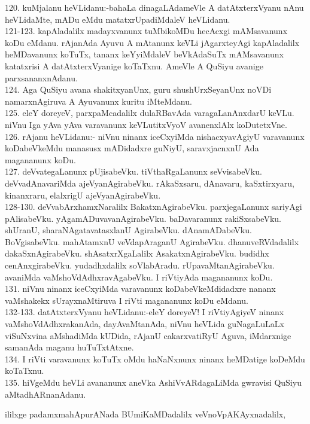 \documentclass{article}
\begin{document}
120. kuMjalanu heVLidanu:-bahaLa dinagaLAdameVle A datAtxterxVyanu nAnu heVLidaMte, mADu eMdu matatxrUpadiMdaleV heVLidanu.\\
121-123. kapAladalilx madayxvanunx tuMbikoMDu hecAcxgi mAMsavanunx koDu eMdanu. rAjanAda Ayuvu A mAtanunx keVLi jAgarxteyAgi kapAladalilx heMDavanunx koTuTx, tananx keYyiMdaleV beVkAdaSuTx mAMsavanunx katatxrisi A datAtxterxVyanige koTaTxnu. AmeVle A QuSiyu avanige parxsananxnAdanu.\\
124. Aga QuSiyu avana shakitxyanUnx, guru shushUrxSeyanUnx noVDi namarxnAgiruva A Ayuvanunx kuritu iMteMdanu.\\
125. eleY doreyeV, parxpaMcadalilx dulaRBavAda varagaLanAnxdarU keVLu. niVnu Iga yAva yAva varavanunx keVLutitxVyoV avanenxlAlx koDutetxVne.\\
126. rAjanu heVLidanu:- niVnu ninanx iceCxyiMda nishacxyavAgiyU varavanunx koDabeVkeMdu manasusx mADidadxre guNiyU, saravxjacnxnU Ada magananunx koDu.\\
127. deVvategaLanunx pUjisabeVku. tiVthaRgaLanunx seVvisabeVku. deVvadAnavariMda ajeVyanAgirabeVku. rAkaSxsaru, dAnavaru, kaSxtirxyaru, kinanxraru, elalxrigU ajeVyanAgirabeVku.\\
128-130. deVvabArxhamxNaralilx BakatxnAgirabeVku. parxjegaLanunx sariyAgi pAlisabeVku. yAgamADuvavanAgirabeVku. baDavaranunx rakiSxsabeVku. shUranU, sharaNAgatavatasxlanU AgirabeVku. dAnamADabeVku. BoVgisabeVku. mahAtamxnU veVdapAraganU AgirabeVku. dhanuveRVdadalilx dakaSxnAgirabeVku. shAsatxrXgaLalilx AsakatxnAgirabeVku. budidhx cenAnxgirabeVku. yudadhxdalilx soVlabAradu. rUpavaMtanAgirabeVku. avaniMda vaMshoVdAdhxravAgabeVku. I riVtiyAda magananunx koDu.\\
131. niVnu ninanx iceCxyiMda varavanunx koDabeVkeMdidadxre nananx vaMshakekx sUrayxnaMtiruva I riVti magananunx koDu eMdanu.\\
132-133. datAtxterxVyanu heVLidanu:-eleY doreyeV! I riVtiyAgiyeV ninanx vaMshoVdAdhxrakanAda, dayAvaMtanAda, niVnu heVLida guNagaLuLaLx viSuNxvina aMshadiMda kUDida, rAjanU cakarxvatiRyU Aguva, iMdarxnige samanAda maganu huTuTxtAtxne.\\
134. I riVti varavanunx koTuTx oMdu haNaNxnunx ninanx heMDatige koDeMdu koTaTxnu.\\
135. hiVgeMdu heVLi avananunx aneVka AshiVvARdagaLiMda gwravisi QuSiyu aMtadhARnanAdanu.

\begin{center}
ililxge padamxmahApurANada BUmiKaMDadalilx veVnoVpAKAyxnadalilx,
\end{center}
\end{document}

